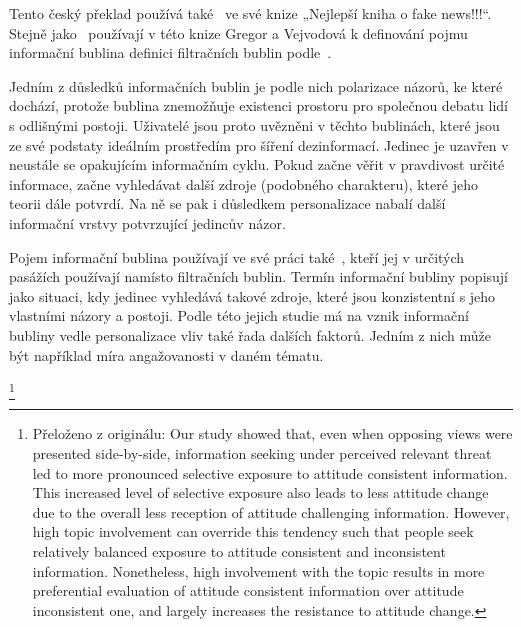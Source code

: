     Tento český překlad používá také~\cite{GregorVejvodova} ve své knize „Nejlepší kniha o fake news!!!“. Stejně jako~\citep{Mudrovamastersthesis,Rivamastersthesis,Valentovamastersthesis} používají v této knize Gregor a Vejvodová k definování pojmu informační bublina definici filtračních bublin podle~\cite{Pariser2012TheFB}. 
    
    Jedním z důsledků informačních bublin je podle nich polarizace názorů, ke které dochází, protože bublina znemožňuje existenci prostoru pro společnou debatu lidí s odlišnými postoji. Uživatelé jsou proto uvězněni v těchto bublinách, které jsou ze své podstaty ideálním prostředím pro šíření dezinformací. Jedinec je uzavřen v neustále se opakujícím informačním cyklu. Pokud začne věřit v pravdivost určité informace, začne vyhledávat další zdroje (podobného charakteru), které jeho teorii dále potvrdí. Na ně se pak i důsledkem personalizace nabalí další informační vrstvy potvrzující jedincův názor.~\citep{GregorVejvodova}
    
    Pojem informační bublina používají ve své práci také~\cite{Liao}, kteří jej v určitých pasážích používají namísto filtračních bublin. Termín informační bubliny popisují jako situaci, kdy jedinec vyhledává takové zdroje, které jsou konzistentní s jeho vlastními názory a postoji. Podle této jejich studie má na vznik informační bubliny vedle personalizace vliv také řada dalších faktorů. Jedním z nich může být například míra angažovanosti v daném tématu. 
    
    \setlength\parskip{5mm}
    
    \footnote{Přeloženo z originálu: Our  study  showed  that,  even when  opposing  views  were presented  side-by-side,  information seeking  under perceived relevant threat led  to more pronounced selective exposure  to attitude consistent  information.  This  increased level of selective exposure also leads to less attitude change due  to  the  overall  less  reception  of  attitude  challenging information. However, high topic involvement can override this  tendency  such  that  people  seek  relatively  balanced exposure to attitude consistent and inconsistent information. Nonetheless,  high  involvement  with  the  topic  results  in more  preferential  evaluation  of  attitude  consistent information  over  attitude  inconsistent  one,  and  largely increases the resistance to attitude change.}
    
